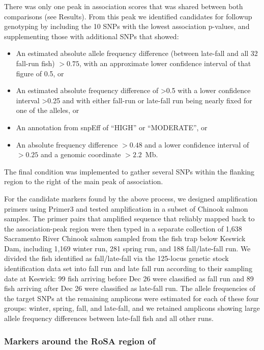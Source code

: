 There was only one peak in association scores that was shared between both comparisons (see 
Results). From this peak we identified candidates for followup genotyping by including the 10 
SNPs with the lowest association p-values, and supplementing those with additional SNPs that 
showed:
\begin{itemize}
\item An estimated absolute allele frequency difference (between late-fall and all 32 fall-run fish)  $>0.75$,  with an approximate lower confidence interval of that figure of 0.5,  or
\item An estimated absolute frequency difference of >0.5 with a lower confidence interval >0.25 and 
with either fall-run or late-fall run being nearly fixed for one of the alleles, or
\item An annotation from snpEff \citep{cingolani2012program} of “HIGH” or “MODERATE”, or
\item An absolute frequency difference $>0.48$ and a lower confidence interval of $>0.25$ and a 
genomic  coordinate $> 2.2$~Mb.
\end{itemize}
The final condition was implemented to gather several SNPs within the flanking region to the right of 
the main peak of association. 

For the candidate markers found by the above process, we designed amplification primers using 
Primer3 \citep{koressaar2007enhancements,untergasser2012primer3} and tested amplification in a 
subset of Chinook salmon 
samples. The primer pairs that amplified sequence that reliably mapped back to the association-peak region were then typed
in a separate collection of 1,638 Sacramento River Chinook salmon sampled from the fish trap below Keswick Dam, including 1,169 winter run, 281 spring 
run, and 188 fall/late-fall run. We divided the fish identified as fall/late-fall via the 125-locus genetic 
stock identification data set into fall run and late fall run according to their sampling date at Keswick: 
99 fish arriving before Dec 26 were classified as fall run and 89 fish arriving after Dec 26 were 
classified as late-fall run.   The allele frequencies of the target SNPs at the remaining amplicons 
were 
estimated for each of these four groups: winter, spring, fall, and late-fall, and we retained
amplicons showing large allele frequency  differences between late-fall fish and all other runs.


\subsubsection*{Markers around the RoSA region of \citet{thompson2020complex}}

